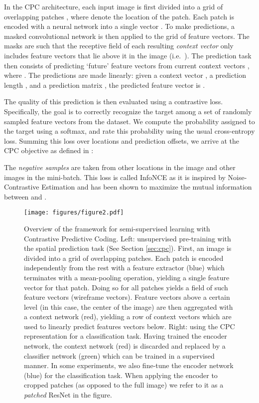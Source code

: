 \documentclass{article}
\begin{document}
In the CPC architecture, each input image is first divided into a grid of overlapping patches , where  denote the location of the patch. Each patch is encoded with a neural network  into a single vector . To make predictions, a masked convolutional network  is then applied to the grid of feature vectors. The masks are such that the receptive field of each resulting \textit{context vector}  only includes feature vectors that lie above it in the image (i.e.\ ). The prediction task then consists of predicting `future' feature vectors  from current context vectors , where . The predictions are made linearly: given a context vector , a prediction length , and a prediction matrix , the predicted feature vector is . 

The quality of this prediction is then evaluated using a contrastive loss. Specifically, the goal is to correctly recognize the target  among a set of randomly sampled feature vectors  from the dataset. We compute the probability assigned to the target using a softmax, and rate this probability using the usual cross-entropy loss. Summing this loss over locations and prediction offsets, we arrive at the CPC objective as defined in \citep{oord2018representation}: 

The \emph{negative samples}  are taken from other locations in the image and other images in the mini-batch. This loss is called InfoNCE as it is inspired by Noise-Contrastive Estimation \citep{gutmann2010noise, mnih2013learning} and has been shown to maximize the mutual information between  and  \citep{oord2018representation}. 

\begin{figure*}[t]
    \texttt{[image: figures/figure2.pdf]}
    \vspace{-2em}
   \caption{
   Overview of the framework for semi-supervised learning with Contrastive Predictive Coding. Left: unsupervised pre-training with the spatial prediction task (See Section \ref{sec:cpc}). First, an image is divided into a grid of overlapping patches. Each patch is encoded independently from the rest with a feature extractor (blue) which terminates with a mean-pooling operation, yielding a single feature vector for that patch. Doing so for all patches yields a field of such feature vectors (wireframe vectors). Feature vectors above a certain level (in this case, the center of the image) are then aggregated with a context network (red), yielding a row of context vectors which are used to linearly predict features vectors below. Right: using the CPC representation for a classification task. Having trained the encoder network, the context network (red) is discarded and replaced by a classifier network (green) which can be trained in a supervised manner. In some experiments, we also fine-tune the encoder network (blue) for the classification task. When applying the encoder to cropped patches (as opposed to the full image) we refer to it as a \textit{patched} ResNet in the figure.} 
\label{fig:cpc}
\end{figure*}
\end{document}
